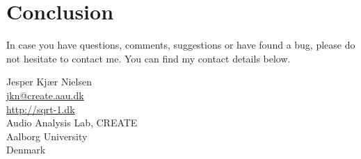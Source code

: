 \chapter{Conclusion}\label{ch:conclusion}
In case you have questions, comments, suggestions or have found a bug, please do not hesitate to contact me. You can find my contact details below.
  \begin{center}
    Jesper Kjær Nielsen\\
    \href{mailto: jkn@create.aau.dk}{jkn@create.aau.dk}\\
    \href{http://sqrt-1.dk}{http://sqrt-1.dk}\\
    Audio Analysis Lab, CREATE\\
    Aalborg University\\
    Denmark
  \end{center}
